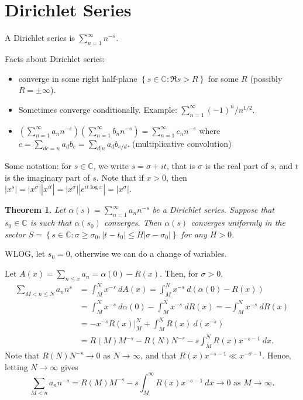 \documentclass[11pt]{article}
\newtheorem{thm}{Theorem}[subsection]
\theoremstyle{definition}
\newcommand{\set}[1]{\left\{ #1 \right\}}
\newcommand{\abs}[1]{\left\lvert#1\right\rvert} %
\newcommand{\CC}{\mathbb{C}}
\begin{document}

\section{Dirichlet Series}

A Dirichlet series is $\sum_{n=1}^\infty n^{-s}$.

Facts about Dirichlet series:
\begin{itemize}
\item converge in some right half-plane $\set{s\in\CC:\Re s>R}$ for some $R$ (possibly
$R=\pm\infty$).
\item Sometimes converge conditionally. Example: $\sum_{n=1}^\infty(-1)^n/n^{1/2}$.
\item $\left(\sum_{n=1}^\infty a_nn^{-s}\right)\left(\sum_{n=1}^\infty b_nn^{-s}\right)
= \sum_{n=1}^\infty c_nn^{-s}$ where $c=\sum_{de=n}a_db_e=\sum_{d|n}a_db_{e/d}$.
(multiplicative convolution)
\end{itemize}

Some notation: for $s\in\CC$, we write $s=\sigma+it$, that is $\sigma$ is the real part of
$s$, and $t$ is the imaginary part of $s$. Note that if $x>0$, then
$\abs{x^s}=\abs{x^\sigma}\abs{x^{it}}=\abs{x^\sigma}\abs{e^{it\log{x}}}=\abs{x^\sigma}$.

\begin{thm}
Let $\alpha(s)=\sum_{n=1}^\infty a_nn^{-s}$ be a Dirichlet series. Suppose that
$s_0\in\CC$ is such that $\alpha(s_0)$ converges. Then $\alpha(s)$ converges uniformly in
the sector $S=\set{s\in\CC:\sigma\ge\sigma_0,\abs{t-t_0}\le H\abs{\sigma-\sigma_0}}$ for
any $H>0$.
\end{thm}

\proof
WLOG, let $s_0=0$, otherwise we can do a change of variables.

Let $A(x)=\sum_{n\le x}a_n=\alpha(0)-R(x)$. Then, for $\sigma>0$,
\begin{align*}
\sum_{M<n\le N}a_n n^s &= \int_M^N x^{-s} ~dA(x) = \int_M^N x^{-s} ~d(\alpha(0)-R(x)) \\
&= \int_M^N x^{-s} ~d\alpha(0) - \int_M^N x^{-s} ~dR(x) = -\int_M^N x^{-s} ~dR(x) \\
&= \left.-x^{-s}R(x)\right|_M^N + \int_M^N R(x) ~d(x^{-s}) \\
&= R(M)M^{-s} - R(N)N^{-s} - s\int_M^N R(x)x^{-s-1} ~dx .
\end{align*}
Note that $R(N)N^{-s}\to0$ as $N\to\infty$, and that $R(x)x^{-s-1}\ll x^{-\sigma-1}$.
Hence, letting $N\to\infty$ gives
\[
  \sum_{M<n}a_nn^{-s} = R(M)M^{-s} - s\int_M^\infty R(x)x^{-s-1} ~dx
  \to 0 \text{ as } M \to \infty .
\]
\end{document}
